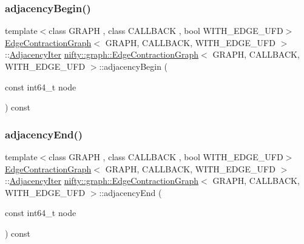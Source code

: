 \mbox{\label{classnifty_1_1graph_1_1EdgeContractionGraph_a687e27cdcc7aef855c05c3444d6af5dc}} 
\subsubsection{\texorpdfstring{adjacency\+Begin()}{adjacencyBegin()}}
{\footnotesize\ttfamily template$<$class G\+R\+A\+PH , class C\+A\+L\+L\+B\+A\+CK , bool W\+I\+T\+H\+\_\+\+E\+D\+G\+E\+\_\+\+U\+FD$>$ \\
\hyperlink{classnifty_1_1graph_1_1EdgeContractionGraph}{Edge\+Contraction\+Graph}$<$ G\+R\+A\+PH, C\+A\+L\+L\+B\+A\+CK, W\+I\+T\+H\+\_\+\+E\+D\+G\+E\+\_\+\+U\+FD $>$\+::\hyperlink{classnifty_1_1graph_1_1EdgeContractionGraph_a447212f5ced0c4ef4d304e8b89f4f200}{Adjacency\+Iter} \hyperlink{classnifty_1_1graph_1_1EdgeContractionGraph}{nifty\+::graph\+::\+Edge\+Contraction\+Graph}$<$ G\+R\+A\+PH, C\+A\+L\+L\+B\+A\+CK, W\+I\+T\+H\+\_\+\+E\+D\+G\+E\+\_\+\+U\+FD $>$\+::adjacency\+Begin (\begin{DoxyParamCaption}\item[{const int64\+\_\+t}]{node }\end{DoxyParamCaption}) const\hspace{0.3cm}{\ttfamily [inline]}}

\mbox{\label{classnifty_1_1graph_1_1EdgeContractionGraph_a07541202609a5f1e66365105354827b5}} 
\subsubsection{\texorpdfstring{adjacency\+End()}{adjacencyEnd()}}
{\footnotesize\ttfamily template$<$class G\+R\+A\+PH , class C\+A\+L\+L\+B\+A\+CK , bool W\+I\+T\+H\+\_\+\+E\+D\+G\+E\+\_\+\+U\+FD$>$ \\
\hyperlink{classnifty_1_1graph_1_1EdgeContractionGraph}{Edge\+Contraction\+Graph}$<$ G\+R\+A\+PH, C\+A\+L\+L\+B\+A\+CK, W\+I\+T\+H\+\_\+\+E\+D\+G\+E\+\_\+\+U\+FD $>$\+::\hyperlink{classnifty_1_1graph_1_1EdgeContractionGraph_a447212f5ced0c4ef4d304e8b89f4f200}{Adjacency\+Iter} \hyperlink{classnifty_1_1graph_1_1EdgeContractionGraph}{nifty\+::graph\+::\+Edge\+Contraction\+Graph}$<$ G\+R\+A\+PH, C\+A\+L\+L\+B\+A\+CK, W\+I\+T\+H\+\_\+\+E\+D\+G\+E\+\_\+\+U\+FD $>$\+::adjacency\+End (\begin{DoxyParamCaption}\item[{const int64\+\_\+t}]{node }\end{DoxyParamCaption}) const\hspace{0.3cm}{\ttfamily [inline]}}

